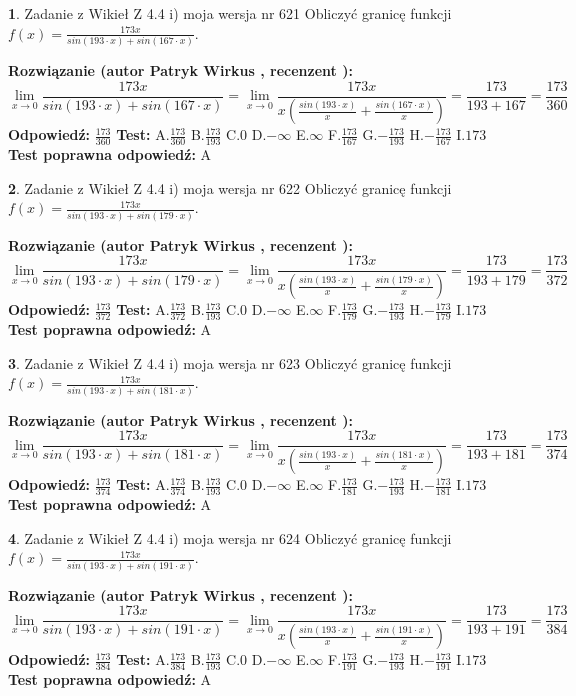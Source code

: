 \documentclass[12pt, a4paper]{article}
\theoremstyle{definition} %
\newtheorem{zad}{}
\newcommand{\zadStart}[1]{\begin{zad}#1\newline}
\newcommand{\zadStop}{\end{zad}}
\newcommand{\rozwStart}[2]{\noindent \textbf{Rozwiązanie (autor #1 , recenzent #2): }\newline}
\newcommand{\rozwStop}{\newline}
\newcommand{\odpStart}{\noindent \textbf{Odpowiedź:}\newline}
\newcommand{\odpStop}{\newline}
\newcommand{\testStart}{\noindent \textbf{Test:}\newline}
\newcommand{\testStop}{\newline}
\newcommand{\kluczStart}{\noindent \textbf{Test poprawna odpowiedź:}\newline}
\newcommand{\kluczStop}{\newline}
\begin{document}
\zadStart{Zadanie z Wikieł Z 4.4 i) moja wersja nr 621}
Obliczyć granicę funkcji $f(x)=\frac{173x}{sin(193\cdot x) +sin(167\cdot x)}$.
\zadStop
\rozwStart{Patryk Wirkus}{}
$$\lim\limits_{x\to 0}\frac{173x}{sin(193\cdot x) +sin(167\cdot x)}=\lim\limits_{x\to 0}\frac{173x}{x(\frac{sin(193\cdot x)}{x}+\frac{sin(167\cdot x)}{x})}=\frac{173}{193+167} = \frac{173}{360}$$
\rozwStop
\odpStart
$\frac{173}{360}$
\odpStop
\testStart
A.$\frac{173}{360}$
B.$\frac{173}{193}$
C.$0$
D.$-\infty$
E.$\infty$
F.$\frac{173}{167}$
G.$-\frac{173}{193}$
H.$-\frac{173}{167}$
I.$173$
\testStop
\kluczStart
A
\kluczStop



\zadStart{Zadanie z Wikieł Z 4.4 i) moja wersja nr 622}
Obliczyć granicę funkcji $f(x)=\frac{173x}{sin(193\cdot x) +sin(179\cdot x)}$.
\zadStop
\rozwStart{Patryk Wirkus}{}
$$\lim\limits_{x\to 0}\frac{173x}{sin(193\cdot x) +sin(179\cdot x)}=\lim\limits_{x\to 0}\frac{173x}{x(\frac{sin(193\cdot x)}{x}+\frac{sin(179\cdot x)}{x})}=\frac{173}{193+179} = \frac{173}{372}$$
\rozwStop
\odpStart
$\frac{173}{372}$
\odpStop
\testStart
A.$\frac{173}{372}$
B.$\frac{173}{193}$
C.$0$
D.$-\infty$
E.$\infty$
F.$\frac{173}{179}$
G.$-\frac{173}{193}$
H.$-\frac{173}{179}$
I.$173$
\testStop
\kluczStart
A
\kluczStop



\zadStart{Zadanie z Wikieł Z 4.4 i) moja wersja nr 623}
Obliczyć granicę funkcji $f(x)=\frac{173x}{sin(193\cdot x) +sin(181\cdot x)}$.
\zadStop
\rozwStart{Patryk Wirkus}{}
$$\lim\limits_{x\to 0}\frac{173x}{sin(193\cdot x) +sin(181\cdot x)}=\lim\limits_{x\to 0}\frac{173x}{x(\frac{sin(193\cdot x)}{x}+\frac{sin(181\cdot x)}{x})}=\frac{173}{193+181} = \frac{173}{374}$$
\rozwStop
\odpStart
$\frac{173}{374}$
\odpStop
\testStart
A.$\frac{173}{374}$
B.$\frac{173}{193}$
C.$0$
D.$-\infty$
E.$\infty$
F.$\frac{173}{181}$
G.$-\frac{173}{193}$
H.$-\frac{173}{181}$
I.$173$
\testStop
\kluczStart
A
\kluczStop



\zadStart{Zadanie z Wikieł Z 4.4 i) moja wersja nr 624}
Obliczyć granicę funkcji $f(x)=\frac{173x}{sin(193\cdot x) +sin(191\cdot x)}$.
\zadStop
\rozwStart{Patryk Wirkus}{}
$$\lim\limits_{x\to 0}\frac{173x}{sin(193\cdot x) +sin(191\cdot x)}=\lim\limits_{x\to 0}\frac{173x}{x(\frac{sin(193\cdot x)}{x}+\frac{sin(191\cdot x)}{x})}=\frac{173}{193+191} = \frac{173}{384}$$
\rozwStop
\odpStart
$\frac{173}{384}$
\odpStop
\testStart
A.$\frac{173}{384}$
B.$\frac{173}{193}$
C.$0$
D.$-\infty$
E.$\infty$
F.$\frac{173}{191}$
G.$-\frac{173}{193}$
H.$-\frac{173}{191}$
I.$173$
\testStop
\kluczStart
A
\kluczStop
\end{document}
